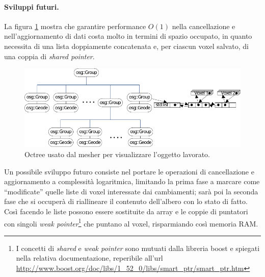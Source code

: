 \paragraph{Sviluppi futuri.}
La figura \ref{fig:meshing_octree} mostra che garantire performance $O(1)$ nella cancellazione e nell'aggiornamento di dati costa molto in termini di spazio occupato, in quanto necessita di una lista doppiamente concatenata e, per ciascun voxel salvato, di una coppia di \emph{shared pointer}.
\begin{figure}[htp]
	\centering
	\includegraphics[width=.85\textwidth]{img/meshing_octree}
	\caption{Octree usato dal mesher per visualizzare l'oggetto lavorato.}
	\label{fig:meshing_octree}
\end{figure}

Un possibile sviluppo futuro consiste nel portare le operazioni di cancellazione e aggiornamento a complessità logaritmica, limitando la prima fase a marcare come ``modificate'' quelle liste di voxel interessate dai cambiamenti; sarà poi la seconda fase che si occuperà di riallineare il contenuto dell'albero con lo stato di fatto. Così facendo le liste possono essere sostituite da array e le coppie di puntatori con singoli \emph{weak pointer}\footnote{I concetti di \emph{shared} e \emph{weak pointer} sono mutuati dalla libreria boost e spiegati nella relativa documentazione, reperibile all'url \url{http://www.boost.org/doc/libs/1_52_0/libs/smart_ptr/smart_ptr.htm}} che puntano al voxel, risparmiando così memoria RAM.
